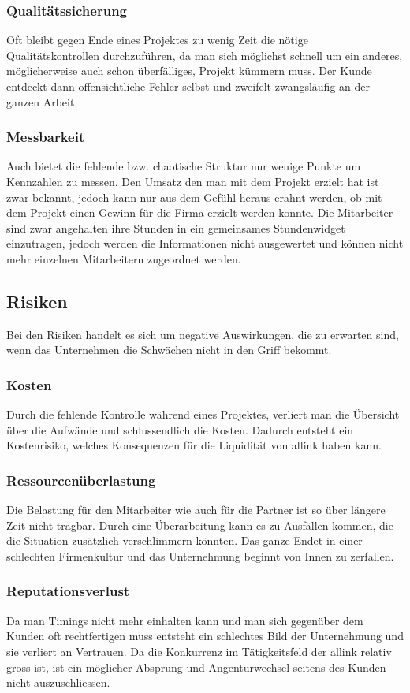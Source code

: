 \subsubsection{Qualitätssicherung}
Oft bleibt gegen Ende eines Projektes zu wenig Zeit die nötige 
Qualitätskontrollen durchzuführen, da man sich möglichst schnell um ein anderes,
möglicherweise auch schon überfälliges, Projekt kümmern muss. Der Kunde entdeckt
dann offensichtliche Fehler selbst und zweifelt zwangsläufig an der ganzen Arbeit.

\subsubsection{Messbarkeit}
Auch bietet die fehlende bzw. chaotische Struktur nur wenige Punkte um Kennzahlen
zu messen. Den Umsatz den man mit dem Projekt erzielt hat ist zwar bekannt,
jedoch kann nur aus dem Gefühl heraus erahnt werden, ob mit dem Projekt einen
Gewinn für die Firma erzielt werden konnte. Die Mitarbeiter sind zwar angehalten
ihre Stunden in ein gemeinsames Stundenwidget einzutragen, jedoch werden
die Informationen nicht ausgewertet und können nicht mehr einzelnen Mitarbeitern
zugeordnet werden.

\subsection{Risiken}
Bei den Risiken handelt es sich um negative Auswirkungen, die zu erwarten sind,
wenn das Unternehmen die Schwächen nicht in den Griff bekommt.

\subsubsection{Kosten}
Durch die fehlende Kontrolle während eines Projektes, verliert man die
Übersicht über die Aufwände und schlussendlich die Kosten. Dadurch entsteht
ein Kostenrisiko, welches Konsequenzen für die Liquidität von allink haben kann.

\subsubsection{Ressourcenüberlastung}
Die Belastung für den Mitarbeiter wie auch für die Partner ist so über
längere Zeit nicht tragbar. Durch eine Überarbeitung kann es zu Ausfällen kommen, die
die Situation zusätzlich verschlimmern könnten. Das ganze Endet in einer 
schlechten Firmenkultur und das Unternehmung beginnt von Innen zu zerfallen.

\subsubsection{Reputationsverlust}
Da man Timings nicht mehr einhalten kann und man sich gegenüber dem Kunden
oft rechtfertigen muss entsteht ein schlechtes Bild der Unternehmung und sie
verliert an Vertrauen. Da die Konkurrenz im Tätigkeitsfeld der allink relativ
gross ist, ist ein möglicher Absprung und Angenturwechsel seitens des Kunden nicht 
auszuschliessen.
